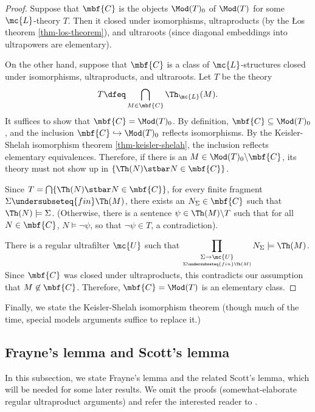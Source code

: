 
\begin{proof}
  Suppose that $\mbf{C}$ is the objects $\Mod(T)_0$ of $\Mod(T)$ for some $\mc{L}$-theory $T$. Then it closed under isomorphisms, ultraproducts (by the {\L}os theorem \ref{thm-los-theorem}), and ultraroots (since diagonal embeddings into ultrapowers are elementary).

  On the other hand, suppose that $\mbf{C}$ is a class of $\mc{L}$-structures closed under isomorphisms, ultraproducts, and ultraroots. Let $T$ be the theory $$T \dfeq \bigcap_{M \in \mbf{C}} \Th_{\mc{L}}(M).$$ It suffices to show that $\mbf{C} = \Mod(T)_0$. By definition, $\mbf{C} \subseteq \Mod(T)_0$, and the inclusion $\mbf{C} \hookrightarrow \Mod(T)_0$ reflects isomorphisms. By the Keisler-Shelah isomorphism theorem \ref{thm-keisler-shelah}, the inclusion reflects elementary equivalences. Therefore, if there is an $M \in \Mod(T)_0 \backslash \mbf{C}$, its theory must not show up in $\{\Th(N) \stbar N \in \mbf{C}\}$.

  Since $T = \bigcap \{\Th(N) \stbar N \in \mbf{C}\}$, for every finite fragment $\Sigma \undersubseteq{fin} \Th(M)$, there exists an $N_{\Sigma} \in \mbf{C}$ such that $\Th(N) \models \Sigma$. (Otherwise, there is a sentence $\psi \in \Th(M) \backslash T$ such that for all $N \in \mbf{C}$, $N \models \neg \psi$, so that $\neg \psi \in T$, a contradiction).

  There is a regular ultrafilter $\mc{U}$ such that $\displaystyle \prod_{\underset{\Sigma \undersubseteq{fin} \Th(M)}{\Sigma \to \mc{U}}} N_{\Sigma} \models \Th(M)$. Since $\mbf{C}$ was closed under ultraproducts, this contradicts our assumption that $M \not \in \mbf{C}$. Therefore, $\mbf{C} = \Mod(T)$ is an elementary class.
  
\end{proof}

Finally, we state the Keisler-Shelah isomorphism theorem (though much of the time, special models arguments suffice to replace it.)


\subsection{Frayne's lemma and Scott's lemma}
In this subsection, we state Frayne's lemma and the related Scott's lemma, which will be needed for some later results. We omit the proofs (somewhat-elaborate regular ultraproduct arguments) and refer the interested reader to \cite{bell-slomson-model-theory}.

